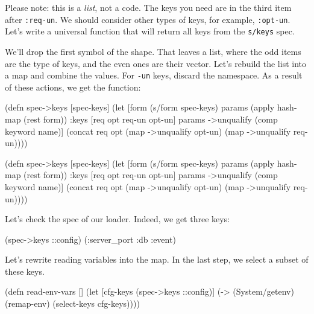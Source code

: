 
Please note: this is a \emph{list}, not a code. The keys you need are in the third item after \verb|:req-un|. We should consider other types of keys, for example, \verb|:opt-un|. Let's write a universal function that will return all keys from the \verb|s/keys| spec.

We'll drop the first symbol of the shape.  That leaves a list, where the odd items are the type of keys, and the even ones are their vector. Let's rebuild the list into a map and combine the values. For \verb|-un| keys, discard the namespace. As a result of these actions, we get the function:


\ifnarrow

\begin{clojure}
(defn spec->keys
  [spec-keys]
  (let [form (s/form spec-keys)
        params (apply hash-map
                 (rest form))
        {:keys [req opt req-un opt-un]}
        params
        ->unqualify (comp keyword name)]
    (concat req
            opt
            (map ->unqualify opt-un)
            (map ->unqualify req-un))))
\end{clojure}

\else

\begin{clojure}
(defn spec->keys
  [spec-keys]
  (let [form (s/form spec-keys)
        params (apply hash-map (rest form))
        {:keys [req opt req-un opt-un]} params
        ->unqualify (comp keyword name)]
    (concat req
            opt
            (map ->unqualify opt-un)
            (map ->unqualify req-un))))
\end{clojure}

\fi

\noindent
Let's check the spec of our loader. Indeed, we get three keys:

\begin{clojure}
(spec->keys ::config)
(:server_port :db :event)
\end{clojure}

\noindent
Let's rewrite reading variables into the map. In the last step, we select a subset of these keys.

\begin{clojure}
(defn read-env-vars []
  (let [cfg-keys (spec->keys ::config)]
    (-> (System/getenv)
        (remap-env)
        (select-keys cfg-keys))))
\end{clojure}

